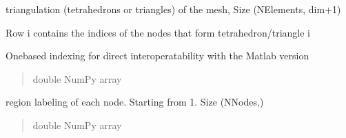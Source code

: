 \documentclass[letterpaper,10pt,english]{sphinxmanual}
\begin{document}
\begin{fulllineitems}
\begin{fulllineitems}
\begin{quote}
\begin{description}
\end{description}\end{quote}

\end{fulllineitems}


\begin{fulllineitems}
\label{\detokenize{_autosummary/nirfasterff.base.stnd_mesh.stndmesh:nirfasterff.base.stnd_mesh.stndmesh.elements}}
\pysigstartsignatures
\pysigline
{}
\pysigstopsignatures
\sphinxAtStartPar
triangulation (tetrahedrons or triangles) of the mesh, Size (NElements, dim+1)

\sphinxAtStartPar
Row i contains the indices of the nodes that form tetrahedron/triangle i

\sphinxAtStartPar
One\sphinxhyphen{}based indexing for direct interoperatability with the Matlab version
\begin{quote}\begin{description}
\sphinxAtStartPar
double NumPy array

\end{description}\end{quote}

\end{fulllineitems}


\begin{fulllineitems}
\label{\detokenize{_autosummary/nirfasterff.base.stnd_mesh.stndmesh:nirfasterff.base.stnd_mesh.stndmesh.region}}
\pysigstartsignatures
\pysigline
{}
\pysigstopsignatures
\sphinxAtStartPar
region labeling of each node. Starting from 1. Size (NNodes,)
\begin{quote}\begin{description}
\sphinxAtStartPar
double NumPy array

\end{description}\end{quote}

\end{fulllineitems}



\end{fulllineitems}
\end{document}
